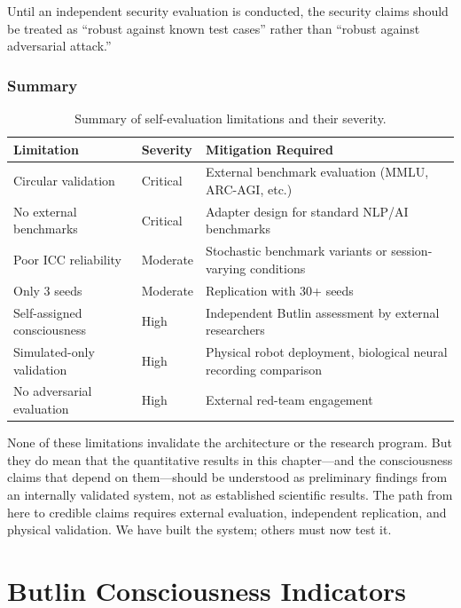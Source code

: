 \documentclass[12pt]{book}
\begin{document}
Until an independent security evaluation is conducted, the security claims should be treated as ``robust against known test cases'' rather than ``robust against adversarial attack.''

\subsection{Summary}

\begin{table}[H]
\centering
\caption{Summary of self-evaluation limitations and their severity.}
\label{tab:limitations}
\begin{tabular}{p{4cm}p{2cm}p{6cm}}
\toprule
\textbf{Limitation} & \textbf{Severity} & \textbf{Mitigation Required} \\
\midrule
Circular validation & Critical & External benchmark evaluation (MMLU, ARC-AGI, etc.) \\
No external benchmarks & Critical & Adapter design for standard NLP/AI benchmarks \\
Poor ICC reliability & Moderate & Stochastic benchmark variants or session-varying conditions \\
Only 3 seeds & Moderate & Replication with 30+ seeds \\
Self-assigned consciousness & High & Independent Butlin assessment by external researchers \\
Simulated-only validation & High & Physical robot deployment, biological neural recording comparison \\
No adversarial evaluation & High & External red-team engagement \\
\bottomrule
\end{tabular}
\end{table}

None of these limitations invalidate the architecture or the research program. But they do mean that the quantitative results in this chapter---and the consciousness claims that depend on them---should be understood as preliminary findings from an internally validated system, not as established scientific results. The path from here to credible claims requires external evaluation, independent replication, and physical validation. We have built the system; others must now test it.


\chapter{Butlin Consciousness Indicators}
\label{ch:butlin}
\end{document}

